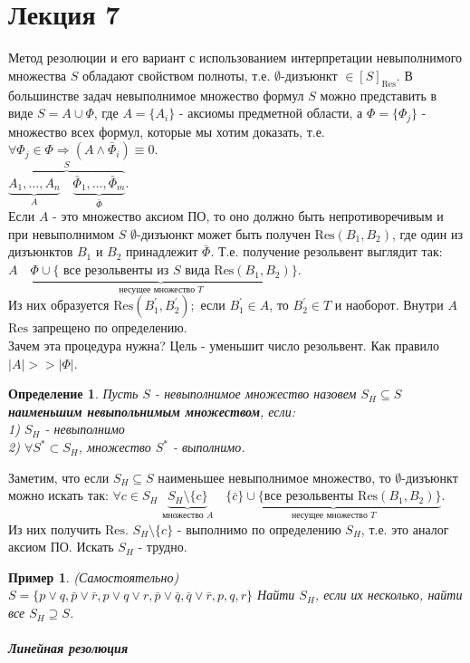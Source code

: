 \documentclass{article}
\newtheorem{example}{Пример}
\newtheorem{definition}{Определение}
\numberwithin{example}{section}
\numberwithin{question}{section}
\numberwithin{Remark}{section}
\numberwithin{theorem}{section}
\numberwithin{definition}{section}
\numberwithin{proposition}{section}
\begin{document}
\section{Лекция 7}
Метод резолюции и его вариант с использованием интерпретации невыполнимого множества $S$ обладают свойством полноты, т.е. $\emptyset$-дизъюнкт $\in[S]_{\mathrm{Res}}$. В большинстве задач невыполнимое множество формул $S$ можно представить в виде $S=A\cup \Phi$, где $A=\{A_i \}$ - аксиомы предметной области, а $\Phi=\{\Phi_j \}$ - множество всех формул, которые мы хотим доказать, т.е. $\forall \Phi_j\in\Phi\Rightarrow (A\wedge \bar{\Phi}_i)\equiv 0$.\\
$\overbrace{\underbrace{A_1,\ldots,A_n}_{A}\quad \underbrace{\bar{\Phi}_1,\ldots,\bar{\Phi}_m}_{\bar{\Phi}}}^{S}$.\\
Если $A$ - это множество аксиом ПО, то оно должно быть непротиворечивым и при невыполнимом $S$ $\emptyset$-дизъюнкт может быть получен $\mathrm{Res}(B_1,B_2)$, где один из дизъюнктов $B_1$ и $B_2$ принадлежит $\bar{\Phi}$. Т.е. получение резольвент выглядит так:\\
$A\quad \underbrace{\Phi\cup\{\text{ все резольвенты из } S \text{ вида } \mathrm{Res}(B_1,B_2)}_{\text{несущее множество } T}\}$.\\
Из них образуется $\mathrm{Res}(B_1^{'},B_2^{'});$ если $B_1^{'}\in A$, то $B_2^{'}\in T$ и наоборот. Внутри $A$ $\mathrm{Res}$ запрещено по определению.\\
Зачем эта процедура нужна? Цель - уменьшит число резольвент. Как правило $|A|>>|\Phi|$. 
\begin{definition}
	Пусть $S$ - невыполнимое множество назовем $S_H\subseteq S$ \textbf{наименьшим невыпольнимым множеством}, если:\\
	1) $S_H$ - невыполнимо\\
	2) $\forall S^*\subset S_H$, множество $S^*$ - выполнимо.
\end{definition}
Заметим, что если $S_H\subseteq S$ наименьшее невыполнимое множество, то $\emptyset$-дизъюнкт можно искать так: $\forall c\in S_H$ $\underbrace{S_H\setminus \{c\}}_{\text{множество }A}\quad \underbrace{\{\bar{c}\}\cup\{\text{все резольвенты }\mathrm{Res}(B_1,B_2)\}}_{\text{несущее множество }T}$.\\
Из них получить $\mathrm{Res}$. $S_H\setminus \{c\}$ - выполнимо по определению $S_H$, т.е. это аналог аксиом ПО. Искать $S_H$ - трудно.
\begin{example}
(Самостоятельно)\\
$S=\{p\vee q,\bar{p}\vee \bar{r},p\vee q\vee r,\bar{p}\vee\bar{q},\bar{q}\vee\bar{r},p,q,r \}$ Найти $S_H$, если их несколько, найти все $S_H\supseteq S$.\\
\\
\textbf{Линейная резолюция}
\end{example}
\end{document}
